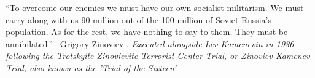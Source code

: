\documentclass{article}%
\begin{document}
\linebreak%
\vspace{1mm}%
\begin{minipage}{\textwidth}%
\flushleft%
“To overcome our enemies we must have our own socialist militarism. We must carry along with us 90 million out of the 100 million of Soviet Russia's population. As for the rest, we have nothing to say to them. They must be annihilated.”%
\linebreak%
\vspace{1mm}%
–Grigory Zinoviev%
, \textit{Executed alongside Lev Kamenevin in 1936 following the Trotskyite-Zinovievite Terrorist Center Trial, or Zinoviev-Kamenev Trial, also known as the 'Trial of the Sixteen'}%
\linebreak%
\vspace{1mm}%
\end{minipage}%
\linebreak%
\vspace{1mm}

%
\end{document}
